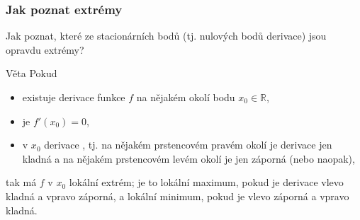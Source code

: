 \documentclass[handout]%
{beamer}
\newcommand{\R}{\mathbb R}
\begin{document}
\begin{frame}
\frametitle{Jak poznat extrémy}
	Jak poznat, které ze stacionárních bodů (tj. nulových bodů derivace) jsou opravdu extrémy?\pause
	\begin{block}{Věta}
	Pokud
	\begin{itemize}
		\item existuje derivace funkce $f$ na nějakém okolí bodu $x_0 \in \R$,\pause
		\item je $f'(x_0) = 0$,\pause
		\item v $x_0$ derivace \alert{}, tj. na nějakém prstencovém pravém okolí je derivace jen kladná a na nějakém prstencovém levém okolí je jen záporná (nebo naopak),\pause
	\end{itemize}
	tak má $f$ v $x_0$ lokální extrém; \pause je to lokální maximum, pokud je derivace \alert{vlevo kladná a vpravo záporná}, a lokální minimum, pokud je \alert{vlevo záporná a vpravo kladná}.
	\end{block}
\end{frame}
\end{document}

